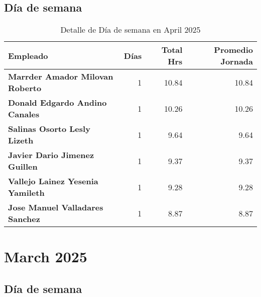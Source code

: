 \documentclass[11pt,a4paper]{article}
\newcommand{\mejoradatabla}[1]{
  \renewcommand{\arraystretch}{1.3}
  \setlength{\tabcolsep}{10pt}
  #1
  \renewcommand{\arraystretch}{1}
  \setlength{\tabcolsep}{6pt}
}
\begin{document}
\subsection{ Día de semana }

\vspace{0.5cm}
\begin{table}[H]
\centering
\mejoradatabla{
\begin{tabular}{>{\bfseries}lrrr}
\toprule
\rowcolor{grisclaro} \textbf{Empleado} & \textbf{Días} & \textbf{Total Hrs} & \textbf{Promedio Jornada}\\
\midrule

Marrder Amador Milovan Roberto & 1 & 10.84 & 10.84\\

Donald Edgardo Andino Canales & 1 & 10.26 & 10.26\\

Salinas Osorto Lesly Lizeth & 1 & 9.64 & 9.64\\

Javier Dario  Jimenez Guillen & 1 & 9.37 & 9.37\\

Vallejo Lainez Yesenia Yamileth & 1 & 9.28 & 9.28\\

Jose Manuel Valladares Sanchez & 1 & 8.87 & 8.87\\

\bottomrule
\end{tabular}
}
\caption{Detalle de Día de semana en April 2025}
\end{table}




\section{ March 2025 }



\subsection{ Día de semana }
\end{document}
